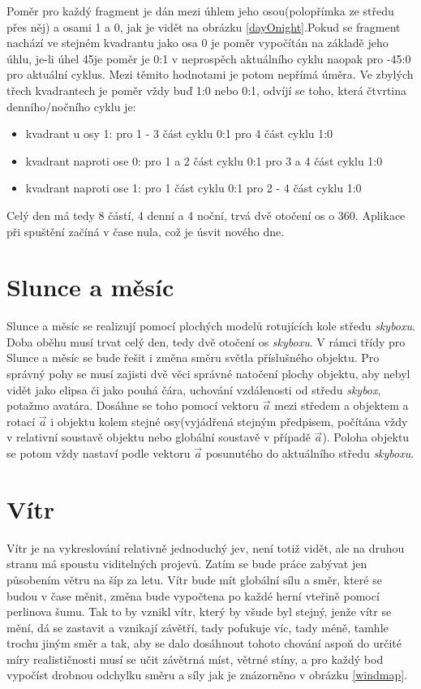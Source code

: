 Poměr pro každý fragment je dán mezi úhlem jeho osou(polopřímka ze středu přes něj) a osami 1 a 0, jak je vidět na obrázku \ref{dayOnight}.Pokud se fragment nachází ve stejném kvadrantu jako osa 0 je poměr vypočítán na základě jeho úhlu, je-li úhel 45\degree  je poměr je 0:1 v neprospěch aktuálního cyklu naopak pro -45:0 pro aktuální cyklus. Mezi těmito hodnotami je potom nepřímá úměra. Ve zbylých třech kvadrantech je poměr vždy buď 1:0 nebo 0:1, odvíjí se toho, která čtvrtina  denního/nočního cyklu je:
\begin{itemize}
	\item kvadrant u osy 1:
		\subitem pro 1 - 3 část cyklu 0:1
		\subitem pro 4 část cyklu 1:0 
	\item kvadrant naproti ose 0:
		\subitem pro 1 a 2 část cyklu 0:1
		\subitem pro 3 a 4 část cyklu 1:0 
	\item kvadrant naproti ose 1:
		\subitem pro 1 část cyklu 0:1
		\subitem pro 2 - 4 část cyklu 1:0 
\end{itemize}
Celý den má tedy 8 částí, 4 denní a 4 noční, trvá dvě otočení os o 360\degree. Aplikace při spuštění začíná v čase nula, což je úsvit nového dne. 
\section{Slunce a měsíc} 
Slunce a měsíc se realizují pomocí plochých modelů rotujících kole středu \emph{skyboxu}. Doba oběhu musí trvat celý den, tedy dvě otočení os \emph{skyboxu}. V rámci třídy pro Slunce a měsíc se bude řešit i změna směru světla příslušného objektu. Pro správný pohy se musí zajisti dvě věci správné natočení plochy objektu, aby nebyl vidět jako elipsa či jako pouhá čára, uchování vzdálenosti od středu \emph{skybox}, potažmo avatára. Dosáhne se toho pomocí vektoru $\vec{a}$ mezi středem a objektem a rotací $\vec{a}$ i objektu kolem stejné osy(vyjádřená stejným předpisem, počítána vždy v relativní soustavě objektu nebo globální soustavě v případě $\vec{a}$). Poloha objektu se potom vždy nastaví podle vektoru $\vec{a}$ posunutého do aktuálního středu \emph{skyboxu}.
\section{Vítr}
Vítr je na vykreslování relativně jednoduchý jev, není totiž vidět, ale na druhou stranu má spoustu viditelných projevů. Zatím se bude práce zabývat jen působením větru na šíp za letu.
Vítr bude mít globální sílu a směr, které se budou v čase měnit, změna bude vypočtena po každé herní vteřině pomocí perlinova šumu. Tak to by vznikl vítr, který by všude byl stejný, jenže vítr se mění, dá se zastavit a vznikají závětří, tady pofukuje víc, tady méně, tamhle trochu jiným směr a tak, aby se dalo dosáhnout tohoto chování aspoň do určité míry realističnosti musí se učit závětrná míst, větrné stíny, a pro každý bod vypočíst drobnou odchylku směru a síly jak je znázorněno v obrázku \ref{windmap}.

